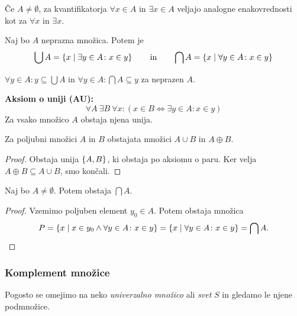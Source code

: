 \documentclass[12pt, a4paper]{article}
\renewcommand{\iff}{\Leftrightarrow}
\begin{document}
\begin{opomba}
Če $A\ne\emptyset$, za kvantifikatorja $\forall x\in A$ in $\exists x\in A$ veljajo analogne enakovrednosti kot za $\forall x$ in $\exists x$.
\end{opomba}

\begin{definicija}
Naj bo $A$ neprazna množica. Potem je
\[
\bigcup A=\left\{x\mid \exists y\in A\colon x\in y\right\}\qquad\text{in}\qquad\bigcap A=\left\{x\mid \forall y\in A\colon x\in y\right\}
\]
\end{definicija}

\begin{trditev}
$\forall y\in A\colon y\subseteq\bigcup A$ in $\forall y\in A\colon\bigcap A\subseteq y$ za neprazen $A$.
\end{trditev}

\obvs

\begin{okvir}
\textbf{Aksiom o uniji (AU):}
\[
\forall A~\exists B~\forall x\colon(x\in B\iff\exists y\in A\colon x\in y)
\]
Za vsako množico $A$ obstaja njena unija.
\end{okvir}

\begin{posledica}
Za poljubni množici $A$ in $B$ obstajata množici $A\cup B$ in $A\oplus B$.
\end{posledica}

\begin{proof}
Obstaja unija $\left\{A,B\right\}$, ki obstaja po aksiomu o paru. Ker velja $A\oplus B\subseteq A\cup B$, smo končali.
\end{proof}

\begin{trditev}
Naj bo $A\ne\emptyset$. Potem obstaja $\bigcap A$.
\end{trditev}

\begin{proof}
Vzemimo poljuben element $y_0\in A$. Potem obstaja množica
\[
P=\left\{x\mid x\in y_0\land \forall y\in A\colon x\in y\right\}=\left\{x\mid\forall y\in A\colon x\in y\right\}=\bigcap A.\qedhere
\]
\end{proof}

\newpage

\subsubsection{Komplement množice}

Pogosto se omejimo na neko \emph{univerzalno množico} ali \emph{svet} $S$ in gledamo le njene podmnožice.
\end{document}
